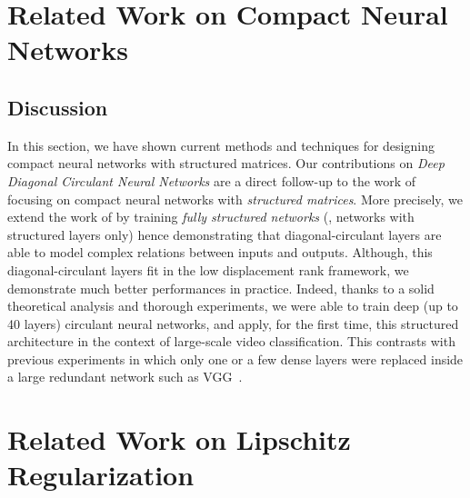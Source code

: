 

\section{Related Work on Compact Neural Networks}
\label{section:ch3-related_work_on_compact_neural_networks}



\subsection{Discussion}

In this section, we have shown current methods and techniques for designing compact neural networks with structured matrices. 
Our contributions on \emph{Deep Diagonal Circulant Neural Networks} are a direct follow-up to the work of~\citet{cheng2015exploration,sindhwani2015structured,moczulski2016acdc,thomas2018learning} focusing on compact neural networks with \emph{structured matrices}.
More precisely, we extend the work of \citet{moczulski2016acdc} by training \emph{fully structured networks} (\ie, networks with structured layers only) hence demonstrating that diagonal-circulant layers are able to model complex relations between inputs and outputs.
Although, this diagonal-circulant layers fit in the low displacement rank framework, we demonstrate much better performances in practice.
Indeed, thanks to a solid theoretical analysis and thorough experiments, we were able to train deep (up to 40 layers) circulant neural networks, and apply, for the first time, this structured architecture in the context of large-scale video classification.
This contrasts with previous experiments in which only one or a few dense layers were replaced inside a large redundant network such as VGG~\cite{simonyan2014very}.


\section{Related Work on Lipschitz Regularization}
\label{section:ch3-related_work_on_lipschitz_regularization}


